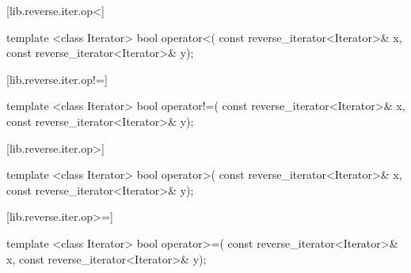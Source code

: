 \begin{itemdescr}
\pnum
\returns
{}
\end{itemdescr}

[lib.reverse.iter.op<]{}

%
\begin{itemdecl}
template <class Iterator>
  bool operator<(
    const reverse_iterator<Iterator>& x,
    const reverse_iterator<Iterator>& y);
\end{itemdecl}

\begin{itemdescr}
\pnum
\returns
{}
\end{itemdescr}

[lib.reverse.iter.op!=]{}

%
\begin{itemdecl}
template <class Iterator>
  bool operator!=(
    const reverse_iterator<Iterator>& x,
    const reverse_iterator<Iterator>& y);
\end{itemdecl}

\begin{itemdescr}
\pnum
\returns
{}
\end{itemdescr}

[lib.reverse.iter.op>]{}

%
\begin{itemdecl}
template <class Iterator>
  bool operator>(
    const reverse_iterator<Iterator>& x,
    const reverse_iterator<Iterator>& y);
\end{itemdecl}

\begin{itemdescr}
\pnum
\returns
{}
\end{itemdescr}

[lib.reverse.iter.op>=]{}

%
\begin{itemdecl}
template <class Iterator>
  bool operator>=(
    const reverse_iterator<Iterator>& x,
    const reverse_iterator<Iterator>& y);
\end{itemdecl}

\begin{itemdescr}
\pnum
\returns
{}
\end{itemdescr}

